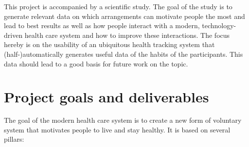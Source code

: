 \documentclass[a4paper,11pt]{article}
\providecommand*{\note}[1]{\small \textcolor{RoyalBlue}{\begin{minipage}{\textwidth}{#1}\end{minipage}}}
\begin{document}
This project is accompanied by a scientific study. The goal of the study is to generate relevant data on which arrangements can motivate people the most and lead to best results as well as how people interact with a modern, technology-driven health care system and how to improve these interactions. The focus hereby is on the usability of an ubiquitous health tracking system that (half-)automatically generates useful data of the habits of the participants. This data should lead to a good basis for future work on the topic. \\

\pagebreak

\section{Project goals and deliverables}
\label{sect:goals}


The goal of the modern health care system is to create a new form of voluntary system that motivates people to live and stay healthy. 
It is based on several pillars:
\end{document}
